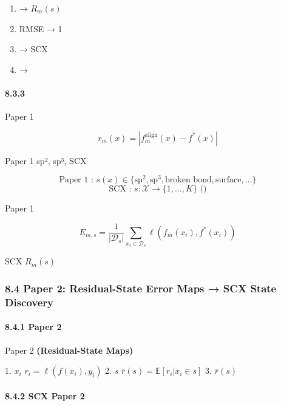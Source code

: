 \documentclass[
  12pt,
]{article}
\providecommand{\tightlist}{%
  \setlength{\itemsep}{0pt}\setlength{\parskip}{0pt}}
\begin{document}
\begin{enumerate}
\def\labelenumi{\arabic{enumi}.}
\tightlist
\item
  \textbf{} → \(R_m(s)\)
  
\item
  \textbf{} RMSE  →  1
  
\item
  \textbf{} → SCX 
\item
  \textbf{} →
  
\end{enumerate}

\paragraph{8.3.3 }\label{ux5f62ux5f0fux5316ux8fdeux63a5}

Paper 1 

\[
r_m(x) = |f_m^{\text{align}}(x) - f^*(x)|
\]

Paper 1  sp², sp³, 
SCX 

\[
\text{Paper 1 : } s(x) \in \{\text{sp}^2, \text{sp}^3, \text{broken bond}, \text{surface}, \dots\}
\] \[
\text{SCX : } s: \mathcal{X} \to \{1, \dots, K\} \text{ ()}
\]

Paper 1 

\[
E_{m,s} = \frac{1}{|\mathcal{D}_s|} \sum_{x_i \in \mathcal{D}_s} \ell(f_m(x_i), f^*(x_i))
\]

 SCX  \(R_m(s)\) 

\subsubsection{8.4 Paper 2: Residual-State Error Maps → SCX  State
Discovery}\label{paper-2-residual-state-error-maps-scx-ux7684-state-discovery}

\paragraph{8.4.1 Paper 2
}\label{paper-2-ux7684ux6838ux5fc3ux5185ux5bb9}

Paper 2 \textbf{ (Residual-State
Maps)}

\textbf{} 1.  \(x_i\)
\(r_i = \ell(f(x_i), y_i)\) 2.  \(s\)
\(\bar{r}(s) = \mathbb{E}[r_i | x_i \in s]\) 3.  \(\bar{r}(s)\)


\paragraph{8.4.2 SCX  Paper 2
}\label{scx-ux4ece-paper-2-ux7ee7ux627fux7684ux6d1eux5bdf}
\end{document}
